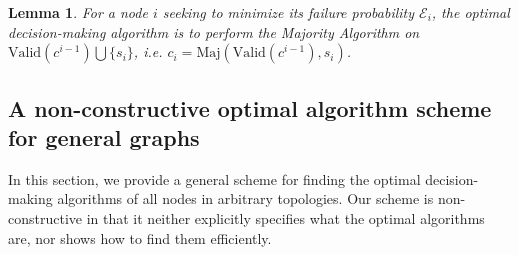 \documentclass[a4paper,UKenglish]{lipics}
\newtheorem{lem}[thm]{Lemma}
\theoremstyle{definition}
\newcommand{\Maj}{\text{Maj}}
\begin{document}
\begin{lem}
\label{lem:selfMaj}
For a node $i$ seeking to minimize its failure probability $\mathcal{E}_i$, the optimal decision-making algorithm is to perform the Majority Algorithm on $\text{Valid}(c^{i - 1})\bigcup\{s_i\}$, i.e. $c_i = \Maj(\text{Valid}(c^{i - 1}), s_i)$.
\end{lem}



\subsection{A non-constructive optimal algorithm scheme for general graphs}
\label{Construction}
In this section, we provide a general scheme for finding the optimal decision-making algorithms of all nodes in arbitrary topologies. Our scheme is non-constructive in that it neither explicitly specifies what the optimal algorithms are, nor shows how to find them efficiently. 

\end{document}
